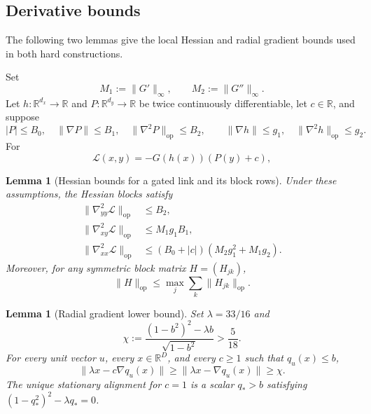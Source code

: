 \documentclass{article}
\newcommand{\R}{\mathbb{R}}
\newtheorem{lemma}[theorem]{Lemma}
\theoremstyle{definition}
\newcommand{\op}{\mathrm{op}}
\begin{document}
\subsection{Derivative bounds}

The following two lemmas give the local Hessian and radial gradient bounds used
in both hard constructions.

Set
\begin{equation}
 M_1:=\|G'\|_\infty,
 \qquad
 M_2:=\|G''\|_\infty.
 \label{eq:shared-gate-derivative-norms}
\end{equation}
Let $h:\R^{d_x}\to\R$ and $P:\R^{d_y}\to\R$ be twice continuously
differentiable, let $c\in\R$, and suppose
\begin{equation}
 |P|\le B_0,\quad
 \|\nabla P\|\le B_1,\quad
 \|\nabla^2P\|_{\op}\le B_2,\qquad
 \|\nabla h\|\le g_1,\quad
 \|\nabla^2h\|_{\op}\le g_2.
 \label{eq:gated-link-premises}
\end{equation}
For
\begin{equation}
 \mathcal L(x,y)=-G(h(x))(P(y)+c),
\end{equation}

\begin{lemma}[Hessian bounds for a gated link and its block rows]
\label{lem:gated-link-hessian}
Under these assumptions, the Hessian blocks satisfy
\begin{align}
 \|\nabla^2_{yy}\mathcal L\|_{\op}
 &\le B_2,
 \label{eq:gated-link-current}\\
 \|\nabla^2_{xy}\mathcal L\|_{\op}
 &\le M_1g_1B_1,
 \label{eq:gated-link-cross}\\
 \|\nabla^2_{xx}\mathcal L\|_{\op}
 &\le(B_0+|c|)(M_2g_1^2+M_1g_2).
 \label{eq:gated-link-previous}
\end{align}
Moreover, for any symmetric block matrix $H=(H_{jk})$,
\begin{equation}
 \|H\|_{\op}
 \le\max_j\sum_k\|H_{jk}\|_{\op}.
 \label{eq:block-row-operator-bound}
\end{equation}
\end{lemma}

\begin{lemma}[Radial gradient lower bound]
\label{lem:radial-alignment-barrier}
Set $\lambda=33/16$ and
\begin{equation}
 \chi:=
 \frac{(1-b^2)^2-\lambda b}{\sqrt{1-b^2}}
 >\frac5{18}.
 \label{eq:explicit-radial-chi}
\end{equation}
For every unit vector $u$, every $x\in\R^D$, and every $c\ge1$ such that
$q_u(x)\le b$,
\begin{equation}
 \|\lambda x-c\nabla q_u(x)\|
 \ge\|\lambda x-\nabla q_u(x)\|
 \ge\chi.
 \label{eq:radial-norm-comparison}
\end{equation}
The unique stationary alignment for $c=1$ is a scalar $q_*>b$ satisfying
$(1-q_*^2)^2-\lambda q_*=0$.
\end{lemma}
\end{document}
